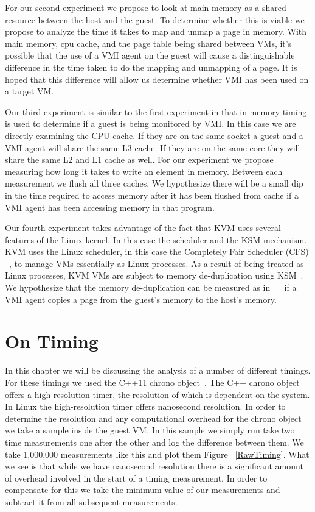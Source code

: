 For our second experiment we propose to look at main memory as a shared resource between the host and the guest. To determine whether this is viable we propose to analyze the time it takes to map and unmap a page in memory. With main memory, cpu cache, and the page table being shared between VMs,  it's possible that the use of a VMI agent on the guest will cause a distinguishable difference in the time taken to do the mapping and unmapping of a page. It is hoped that this difference will allow us determine whether VMI has been used on a target VM. 

Our third experiment is similar to the first experiment in that in memory timing is used to determine if a guest is being monitored by VMI. In this case we are directly examining the CPU cache. If they are on the same socket a guest and a VMI agent will share the same L3 cache. If they are on the same core they will share the same L2 and L1 cache as well. For our experiment we propose measuring how long it takes to write an element in memory. Between each measurement we flush all three caches. We hypothesize there will be a small dip in the time required to access memory after it has been flushed from cache if a VMI agent has been accessing memory in that program. 

Our fourth experiment takes advantage of the fact that KVM uses several features of the Linux kernel. In this case the scheduler and the KSM mechanism. KVM uses the Linux scheduler, in this case the Completely Fair Scheduler (CFS) ~\cite{pabla_completely_2009}, to manage VMs essentially as Linux processes. As a result of being treated as Linux processes, KVM VMs are subject to memory de-duplication using KSM~\cite{kivity_kvm:_2007}. We hypothesize that the memory de-duplication can be measured as in ~\cite{xiao_security_2013}~\cite{owens_non-interactive_2011} if a VMI agent copies a page from the guest's memory to the host's memory.

\section{On Timing}

In this chapter we will be discussing the analysis of a number of different timings. For these timings we used the C++11 chrono object~\cite{_chrono_2014}. The C++ chrono object offers a high-resolution timer, the resolution of which is dependent on the system. In Linux the high-resolution timer offers nanosecond resolution.  In order to determine the resolution and any computational overhead for the chrono object we take a sample inside the guest VM. In this sample we simply run take two time measurements one after the other and log the difference between them. We take 1,000,000 measurements like this and plot them Figure ~\ref{RawTiming}. What we see is that while we have nanosecond resolution there is a significant amount of overhead involved in the start of a timing measurement. In order to compensate for this we take the minimum value of our measurements and subtract it from all subsequent measurements. 


